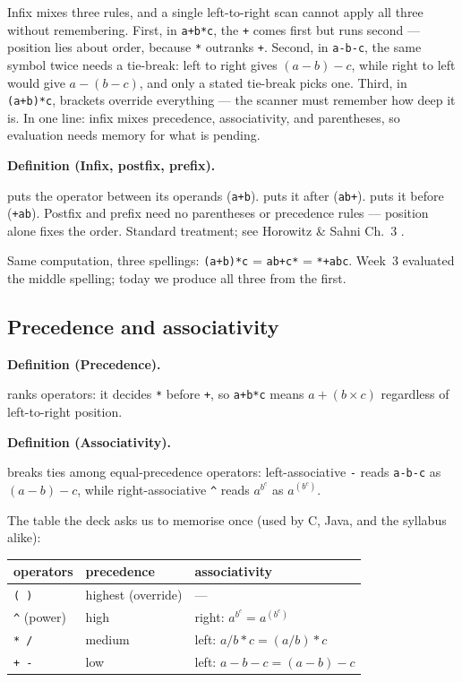 \documentclass[11pt]{article}
\newenvironment{definitionbox}[1]{%
  \par\noindent\textbf{Definition (#1).}\ \itshape
}{\par\vspace{0.3em}}
\begin{document}
Infix mixes three rules, and a single left-to-right scan cannot apply all three without remembering. First, in \texttt{a+b*c}, the \texttt{+} comes first but runs second --- position lies about order, because \texttt{*} outranks \texttt{+}. Second, in \texttt{a-b-c}, the same symbol twice needs a tie-break: left to right gives $(a-b)-c$, while right to left would give $a-(b-c)$, and only a stated tie-break picks one. Third, in \texttt{(a+b)*c}, brackets override everything --- the scanner must remember how deep it is. In one line: infix mixes precedence, associativity, and parentheses, so evaluation needs memory for what is pending.

\begin{definitionbox}{Infix, postfix, prefix}
 puts the operator between its operands (\texttt{a+b}).  puts it after (\texttt{ab+}).  puts it before (\texttt{+ab}). Postfix and prefix need no parentheses or precedence rules --- position alone fixes the order. Standard treatment; see Horowitz \& Sahni Ch.~3 \cite{HorowitzSahni2008_fundamentals_data_structures}.
\end{definitionbox}

Same computation, three spellings: \texttt{(a+b)*c} = \texttt{ab+c*} = \texttt{*+abc}. Week~3 evaluated the middle spelling; today we produce all three from the first.

\subsection{Precedence and associativity}

\begin{definitionbox}{Precedence}
 ranks operators: it decides \texttt{*} before \texttt{+}, so \texttt{a+b*c} means $a + (b \times c)$ regardless of left-to-right position.
\end{definitionbox}

\begin{definitionbox}{Associativity}
 breaks ties among equal-precedence operators: left-associative \texttt{-} reads \texttt{a-b-c} as $(a-b)-c$, while right-associative \texttt{\^{}} reads $a^{b^{c}}$ as $a^{(b^{c})}$.
\end{definitionbox}

The table the deck asks us to memorise once (used by C, Java, and the syllabus alike):

\begin{center}
{\small
\begin{tabular}{lll}
  \toprule
  \textbf{operators} & \textbf{precedence} & \textbf{associativity} \\
  \midrule
  \texttt{( )} & highest (override) & --- \\
  \texttt{\^{}} (power) & high & right: $a^{b^{c}} = a^{(b^{c})}$ \\
  \texttt{* /} & medium & left: $a/b*c = (a/b)*c$ \\
  \texttt{+ -} & low & left: $a-b-c = (a-b)-c$ \\
  \bottomrule
\end{tabular}}
\end{center}
\end{document}
